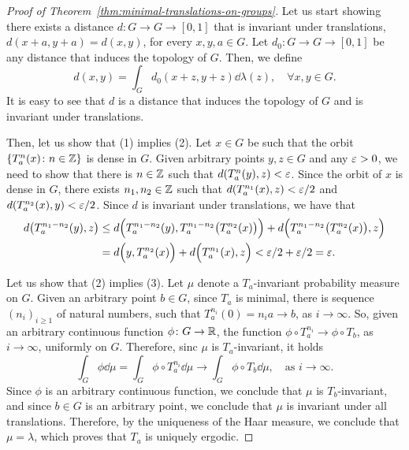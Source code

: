 \begin{proof}[Proof of Theorem~\ref{thm:minimal-translations-on-groups}]
  Let us start showing there exists a distance $d\colon G\to G\to [0,1]$ that is invariant under translations, \ie~$d(x+a,y+a)=d(x,y)$, for every $x,y,a\in G$. Let $d_0\colon G\to G\to [0,1]$ be any distance that induces the topology of $G$. Then, we define
  \begin{displaymath}
    d(x,y)=\int_G d_0(x+z,y+z)\dd\lambda(z),\quad\forall x,y\in G.
  \end{displaymath}
  It is easy to see that $d$ is a distance that induces the topology of $G$ and is invariant under translations.

  Then, let us show that (1) implies (2). Let $x\in G$ be such that the orbit $\{T_a^n(x)\colon n\in\mathbb{Z}\}$ is dense in $G$. Given arbitrary points $y,z\in G$ and any $\varepsilon>0$, we need to show that there is $n\in\mathbb{Z}$ such that $d(T_a^n(y),z)<\varepsilon$. Since the orbit of $x$ is dense in $G$, there exists $n_1,n_2\in\mathbb{Z}$ such that $d(T_a^{n_1}(x),z)<\varepsilon/2$ and $d(T_a^{n_2}(x),y)<\varepsilon/2$. Since $d$ is invariant under translations, we have that
  \begin{displaymath}
    \begin{split}
      d\big(T_a^{n_1-n_2}(y),z\big)&\leq d\Big(T_a^{n_1-n_2}(y),T_a^{n_1-n_2}\big(T_a^{n_2}(x)\big)\Big)+d\Big(T_a^{n_1-n_2}\big(T_a^{n_2}(x)\big),z\Big)\\
      &=d\Big(y,T_a^{n_2}(x)\Big)+d\Big(T_a^{n_1}(x),z\Big)<\varepsilon/2+\varepsilon/2=\varepsilon.
    \end{split}
  \end{displaymath}

  Let us show that (2) implies (3). Let $\mu$ denote a $T_a$-invariant probability measure on $G$. Given an arbitrary point $b\in G$, since $T_a$ is minimal, there is sequence $(n_i)_{i\geq 1}$ of natural numbers, such that $T_a^{n_i}(0)=n_ia\to b$, as $i\to\infty$. So, given an arbitrary continuous function $\phi\colon G\to\mathbb{R}$, the function $\phi\circ T_{a}^{n_i}\to \phi\circ T_b$, as $i\to\infty$, uniformly on $G$. Therefore, sinc $\mu$ is $T_a$-invariant, it holds
  \begin{displaymath}
    \int_G\phi\dd\mu=\int_G\phi\circ T_{a}^{n_i}\dd\mu\to \int_G\phi\circ T_b\dd\mu,\quad\text{as }i\to\infty.
  \end{displaymath}
  Since $\phi$ is an arbitrary continuous function, we conclude that $\mu$ is $T_b$-invariant, and since $b\in G$ is an arbitrary point, we conclude that $\mu$ is invariant under all translations. Therefore, by the uniqueness of the Haar measure, we conclude that $\mu=\lambda$, which proves that $T_a$ is uniquely ergodic.


\end{proof}
